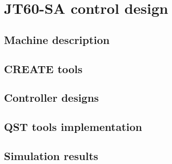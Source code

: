 \chapter{JT60-SA control design}

\section{Machine description}
\section{CREATE tools}
\section{Controller designs}
\section{QST tools implementation}
\section{Simulation results}	